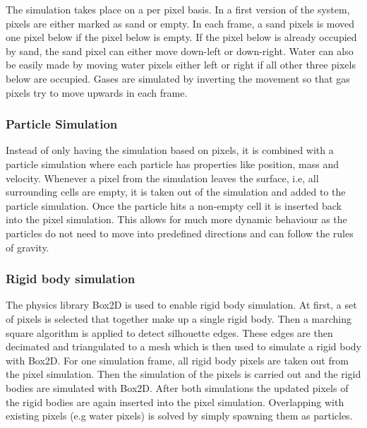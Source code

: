 \documentclass[a4paper]{article}
\begin{document}
The simulation takes place on a per pixel basis. In a first version of the system, pixels are either marked as sand or empty. In each frame, a sand pixels is moved one pixel below if the pixel below is empty. If the pixel below is already occupied by sand, the sand pixel can either move down-left or down-right. Water can also be easily made by moving water pixels either left or right if all other three pixels below are occupied. Gases are simulated by inverting the movement so that gas pixels try to move upwards in each frame.

\subsubsection{Particle Simulation}

Instead of only having the simulation based on pixels, it is combined with a particle simulation where each particle has properties like position, mass and velocity. Whenever a pixel from the simulation leaves the surface, i.e, all surrounding cells are empty, it is taken out of the simulation and added to the particle simulation. Once the particle hits a non-empty cell it is inserted back into the pixel simulation. This allows for much more dynamic behaviour as the particles do not need to move into predefined directions and can follow the rules of gravity.

\subsubsection{Rigid body simulation}

The physics library Box2D is used to enable rigid body simulation.
At first, a set of pixels is selected that together make up a single
rigid body. Then a marching square algorithm is applied to detect silhouette edges. These edges are then decimated and triangulated to a mesh which is then used to simulate a rigid body with Box2D.
For one simulation frame, all rigid body pixels are taken out from the pixel simulation. Then the simulation of the pixels is carried out and the rigid bodies are simulated with Box2D. After both simulations the updated pixels of the rigid bodies are again inserted into the pixel simulation.
Overlapping with existing pixels (e.g water pixels) is solved by simply spawning them as particles.
\end{document}
